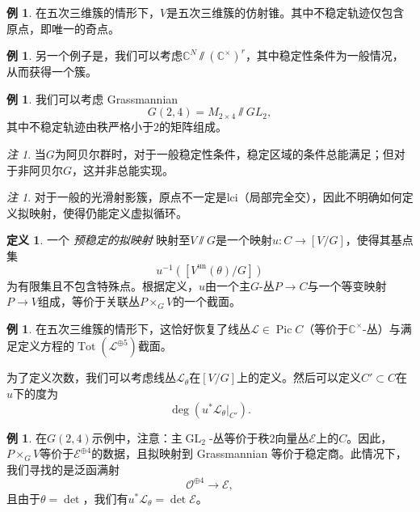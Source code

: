 \documentclass{amsart}
\theoremstyle{definition}
\newtheorem{defn}[thm]{定义}
\newtheorem{exm}[thm]{例}
\theoremstyle{remark}
\newtheorem{rmk}[thm]{注}
\theoremstyle{plain}
\theoremstyle{definition}
\theoremstyle{remark}
\newcommand{\C}{\mathbb{C}}
\newcommand{\mc}[1]{\mathcal{#1}}
\newcommand{\mr}[1]{\mathrm{#1}}
\newcommand{\on}[1]{\operatorname{#1}}
\newcommand{\1}{\mathbf{1}}
\newcommand{\2}{\mathbf{2}}
\newcommand{\3}{\mathbf{3}}
\DeclareMathOperator{\Pic}{Pic}
\begin{document}
\begin{exm}
在五次三维簇的情形下，\(V\)是五次三维簇的仿射锥。其中不稳定轨迹仅包含原点，即唯一的奇点。
\end{exm}

\begin{exm}
另一个例子是，我们可以考虑\(\C^N \sslash (\C^{\times})^r\)，其中稳定性条件为一般情况，从而获得一个簇。
\end{exm}

\begin{exm}
我们可以考虑 Grassmannian
    \[ G(2,4) = M_{2\times 4} \sslash GL_2, \]
    其中不稳定轨迹由秩严格小于\(2\)的矩阵组成。
\end{exm}

\begin{rmk}
当\(G\)为阿贝尔群时，对于一般稳定性条件，稳定区域的条件总能满足；但对于非阿贝尔\(G\)，这并非总能实现。
\end{rmk}

\begin{rmk}
对于一般的光滑射影簇，原点不一定是lci（局部完全交），因此不明确如何定义拟映射，使得仍能定义虚拟循环。
\end{rmk}

\begin{defn}
一个 \textit{ 预稳定的拟映射} 映射至\(V \sslash G\)是一个映射\(u \colon C \to [V/G]\)，使得其基点集
    \[ u^{-1}([V^{\mr{un}}(\theta) / G]) \]
为有限集且不包含特殊点。根据定义，\(u\)由一个主\(G\)-丛\(P \to C\)与一个等变映射\(P \to V\)组成，等价于关联丛\(P \times_G V\)的一个截面。
\end{defn}

\begin{exm}
在五次三维簇的情形下，这恰好恢复了线丛\(\mc{L} \in \Pic C\)（等价于\(\C^{\times}\)-丛）与满足定义方程的\(\on{Tot}(\mc{L}^{\oplus 5})\)截面。
\end{exm}

为了定义次数，我们可以考虑线丛\(\mc{L}_{\theta}\)在\([V/G]\)上的定义。然后可以定义\(C' \subset C\)在\(u\)下的度为
\[ \deg (u^* \mc{L}_{\theta}|_{C'}). \]

\begin{exm}
在\(G(2,4)\)示例中，注意：主\(\on{GL}_2\)-丛等价于秩\(2\)向量丛\(\mc{E}\)上的\(C\)。因此，\(P \times_G V\)等价于\(\mc{E}^{\oplus 4}\)的数据，且拟映射到 Grassmannian 等价于稳定商。此情况下，我们寻找的是泛函满射
    \[ \mc{O}^{\oplus 4} \to \mc{E}, \]
且由于\(\theta = \det\)，我们有\(u^* \mc{L}_{\theta} = \det \mc{E}\)。
\end{exm}
\end{document}
